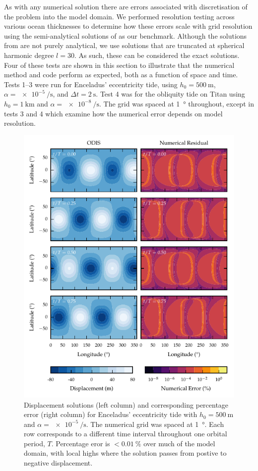 As with any numerical solution there are errors associated with discretisation of the problem into the model domain. We performed resolution testing across various ocean thicknesses to determine how these errors scale with grid resolution using the semi-analytical solutions of \citet{matsuyama2014tidal} as our benchmark. Although the solutions from \citet{matsuyama2014tidal} are not purely analytical, we use solutions that are truncated at spherical harmonic degree $l=30$. As such, these can be considered the exact solutions. Four of these tests are shown in this section to illustrate that the numerical method and code perform as expected, both as a function of space and time. Tests \numrange{1}{3} were run for Enceladus' eccentricity tide, using $h_0 = \SI{500}{\metre}$, $\alpha = \SI{e-5}{\per\second}$, and $\Delta t = \SI{2}{\second}$. Test 4 was for the obliquity tide on Titan using $h_0 = \SI{1}{\kilo\metre}$ and $\alpha = \SI{e-8}{\per\second}$. The grid was spaced at \SI{1}{\degree} throughout, except in tests 3 and 4 which examine how the numerical error depends on model resolution.

\begin{figure}
\centering
\includegraphics[width=0.85\linewidth]{Figures/spatial_error_ecc}
\caption{Displacement solutions (left column) and corresponding percentage error (right column) for Enceladus' eccentricity tide with $h_0 = \SI{500}{\metre}$ and $\alpha = \SI{e-5}{\per\second}$. The numerical grid was spaced at \SI{1}{\degree}. Each row corresponds to a different time interval throughout one orbital period, $T$. Percentage eror is  $< \SI{0.01}{\percent}$ over much of the model domain, with local highs where the solution passes from postive to negative displacement. \label{fig:spatial_error}}
\end{figure}


